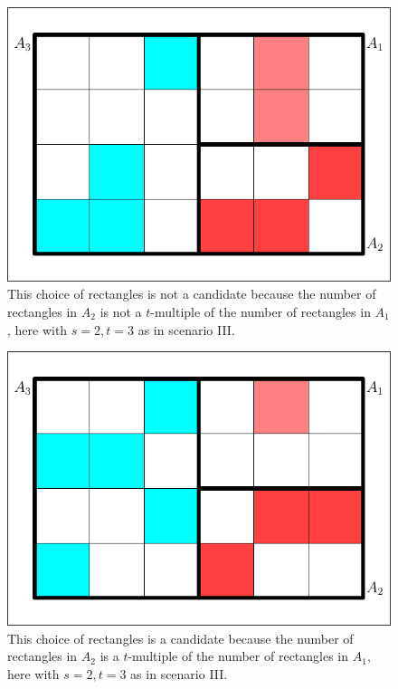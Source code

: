 \documentclass[smallextended]{svjour3}       %
\newcommand{\lwv}[0]{0.6}
\begin{document}
\begin{figure}[h]
  \begin{flushright}
    \begin{minipage}[h]{\lwv\linewidth}
      \includegraphics[width=\textwidth]{partition-2.pdf}
      \caption{This choice of rectangles is not a candidate because
        the number of rectangles in $A_{2}$ is not a $t$-multiple of
        the number of rectangles in $A_{1}$, here with $s=2,t=3$ as in
        scenario III.}
      \label{fig:pwstex1}
    \end{minipage}
  \end{flushright}
\end{figure}

\begin{figure}[h]
  \begin{flushright}
    \begin{minipage}[h]{\lwv\linewidth}
      \includegraphics[width=\textwidth]{partition-1.pdf}
      \caption{This choice of rectangles is a candidate because the
        number of rectangles in $A_{2}$ is a $t$-multiple of the
        number of rectangles in $A_{1}$, here with $s=2,t=3$ as in
        scenario III.}
      \label{fig:pwstex2}
    \end{minipage}
  \end{flushright}
\end{figure}
\end{document}
